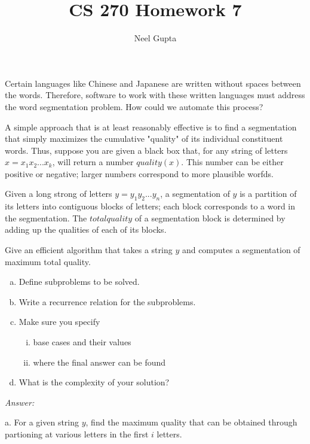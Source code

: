 \documentclass[12pt]{article}
\newenvironment{problem}[2][Problem]{\begin{trivlist}
\item[\hskip \labelsep {\bfseries #1}\hskip \labelsep {\bfseries #2.}]}{\end{trivlist}}
\begin{document}

\title{\vspace{-4cm}CS 270 Homework 7}
\author{Neel Gupta} 
\maketitle

\begin{problem}{1}
    Certain languages like Chinese and Japanese are written without spaces between the words. Therefore, software to work with these written languages must address the word segmentation problem. How could we automate this process? 

    A simple approach that is at least reasonably effective is to find a segmentation that simply maximizes the cumulative "quality" of its individual constituent words. Thus, suppose you are given a black box that, for any string of letters $x=x_1 x_2 ... x_k$, will return a number $quality(x)$. This number can be either positive or negative; larger numbers correspond to more plausible worfds.

    Given a long strong of letters $y=y_1 y_2 ... y_n$, a segmentation of $y$ is a partition of its letters into contiguous blocks of letters; each block corresponds to a word in the segmentation. The $total quality$ of a segmentation block is determined by adding up the qualities of each of its blocks. 

    Give an efficient algorithm that takes a string $y$ and computes a segmentation of maximum total quality. 
    \begin{enumerate}[a.]
        \item Define subproblems to be solved.
        \item Write a recurrence relation for the subproblems.
        \item Make sure you specify
        \begin{enumerate}[i.]
            \item base cases and their values
            \item where the final answer can be found
        \end{enumerate}
        \item What is the complexity of your solution?
    \end{enumerate}
\end{problem}
\textit{Answer:}

a. For a given string $y$, find the maximum quality that can be obtained through partioning at various letters in the first $i$ letters.
\end{document}

